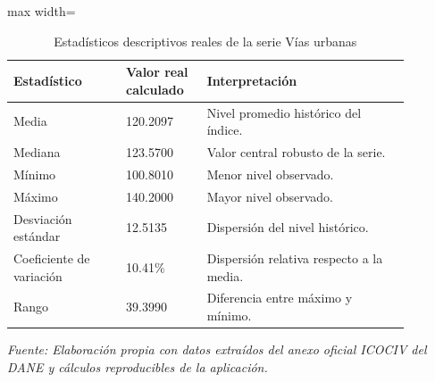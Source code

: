 \begin{table}[H]
\centering
\caption{Estadísticos descriptivos reales de la serie Vías urbanas}
\label{tab:ejemplo_descriptivos_vias_urbanas}
\scriptsize
\begin{adjustbox}{max width=\linewidth}
\begin{tabular}{p{0.25\linewidth}p{0.18\linewidth}p{0.45\linewidth}}
\toprule
Estadístico & Valor real calculado & Interpretación \\
\midrule
Media & 120.2097 & Nivel promedio histórico del índice. \\
Mediana & 123.5700 & Valor central robusto de la serie. \\
Mínimo & 100.8010 & Menor nivel observado. \\
Máximo & 140.2000 & Mayor nivel observado. \\
Desviación estándar & 12.5135 & Dispersión del nivel histórico. \\
Coeficiente de variación & 10.41\% & Dispersión relativa respecto a la media. \\
Rango & 39.3990 & Diferencia entre máximo y mínimo. \\
\bottomrule
\end{tabular}
\end{adjustbox}
\par\footnotesize\textit{Fuente: Elaboración propia con datos extraídos del anexo oficial ICOCIV del DANE y cálculos reproducibles de la aplicación.}
\end{table}
